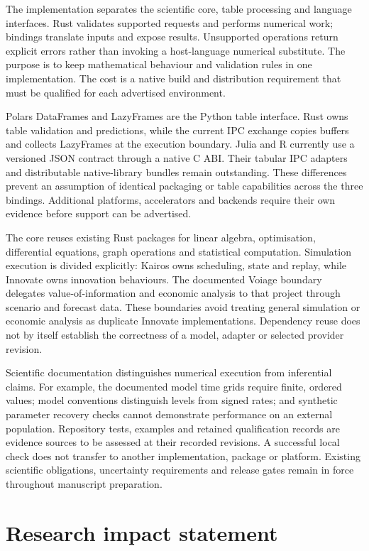 \documentclass[10pt,a4paper,onecolumn]{article}
\begin{document}
The implementation separates the scientific core, table processing and
language interfaces. Rust validates supported requests and performs
numerical work; bindings translate inputs and expose results.
Unsupported operations return explicit errors rather than invoking a
host-language numerical substitute. The purpose is to keep mathematical
behaviour and validation rules in one implementation. The cost is a
native build and distribution requirement that must be qualified for
each advertised environment.

Polars DataFrames and LazyFrames are the Python table interface. Rust
owns table validation and predictions, while the current IPC exchange
copies buffers and collects LazyFrames at the execution boundary. Julia
and R currently use a versioned JSON contract through a native C ABI.
Their tabular IPC adapters and distributable native-library bundles
remain outstanding. These differences prevent an assumption of identical
packaging or table capabilities across the three bindings. Additional
platforms, accelerators and backends require their own evidence before
support can be advertised.

The core reuses existing Rust packages for linear algebra, optimisation,
differential equations, graph operations and statistical computation.
Simulation execution is divided explicitly: Kairos owns scheduling,
state and replay, while Innovate owns innovation behaviours. The
documented Voiage boundary delegates value-of-information and economic
analysis to that project through scenario and forecast data. These
boundaries avoid treating general simulation or economic analysis as
duplicate Innovate implementations. Dependency reuse does not by itself
establish the correctness of a model, adapter or selected provider
revision.

Scientific documentation distinguishes numerical execution from
inferential claims. For example, the documented model time grids require
finite, ordered values; model conventions distinguish levels from signed
rates; and synthetic parameter recovery checks cannot demonstrate
performance on an external population. Repository tests, examples and
retained qualification records are evidence sources to be assessed at
their recorded revisions. A successful local check does not transfer to
another implementation, package or platform. Existing scientific
obligations, uncertainty requirements and release gates remain in force
throughout manuscript preparation.

\section{Research impact statement}\label{research-impact-statement}
\end{document}
